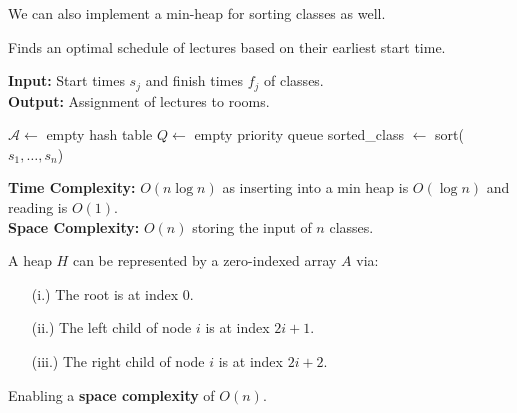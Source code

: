 \noindent
We can also implement a min-heap for sorting classes as well. 
\newpage
\begin{Func}[EarliestStartTimeFirst Algorithm - \texttt{EarliestStartTimeFirst($j = 1 \dots n : s_j, f_j$)}]
    Finds an optimal schedule of lectures based on their earliest start time.

    \vspace{.5em}
    \noindent
    \textbf{Input:} Start times $s_j$ and finish times $f_j$ of classes.\\
    \textbf{Output:} Assignment of lectures to rooms.\\
    \begin{algorithm}[H]
        \SetAlgoLined
        $\mathcal{A} \gets$ empty hash table 
        $Q \gets$ empty priority queue 
        sorted\_class $\gets$ sort($s_1, \dots, s_n$) 
        
    \end{algorithm}

    \noindent
    \textbf{Time Complexity:} $O(n\log n)$ as inserting into a min heap is $O(\log n)$ and reading is $O(1)$.\\
    \textbf{Space Complexity:} $O(n)$ storing the input of $n$ classes.
\end{Func}

\begin{theo}

    A heap $H$ can be represented by a zero-indexed array $A$ via:
    \begin{itemize}
        \item[(i.)] The root is at index $0$.
        \item[(ii.)] The left child of node $i$ is at index $2i + 1$.
        \item[(iii.)] The right child of node $i$ is at index $2i + 2$.
    \end{itemize}

    \noindent
    Enabling a \textbf{space complexity} of $O(n)$.
\end{theo}
\newpage


